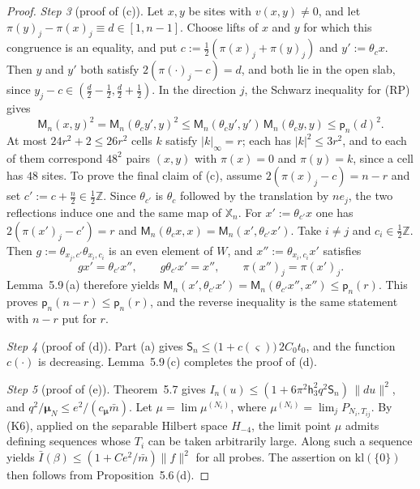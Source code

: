 \documentclass[11pt]{amsart}
\theoremstyle{definition}
\begin{document}
\begin{proof}
\emph{Step 3} (proof of (c)).
Let $x,y$ be sites with $v(x,y)\ne0$, and let $\pi(y)_j-\pi(x)_j\equiv d\in[1,n-1]$.
Choose lifts of $x$ and $y$ for which this congruence is an equality, and put $c:=\frac12(\pi(x)_j+\pi(y)_j)$ and $y':=\theta_cx$.
Then $y$ and $y'$ both satisfy $2(\pi(\cdot)_j-c)=d$, and both lie in the open slab, since $y_j-c\in(\frac d2-\frac12,\frac d2+\frac12)$.
In the direction $j$, the Schwarz inequality for (RP) gives
\begin{equation*}
\mathsf M_n(x,y)^2=\mathsf M_n(\theta_cy',y)^2\le\mathsf M_n(\theta_cy',y')\,\mathsf M_n(\theta_cy,y)\le\mathsf p_n(d)^2.
\end{equation*}
At most $24r^2+2\le26r^2$ cells $k$ satisfy $|k|_\infty=r$; each has $|k|^2\le3r^2$, and to each of them correspond $48^2$ pairs $(x,y)$ with $\pi(x)=0$ and $\pi(y)=k$, since a cell has $48$ sites.
To prove the final claim of (c), assume $2(\pi(x)_j-c)=n-r$ and set $c':=c+\frac n2\in\frac12\mathbb Z$.
Since $\theta_{c'}$ is $\theta_c$ followed by the translation by $ne_j$, the two reflections induce one and the same map of $\mathbb X_n$.
For $x':=\theta_{c'}x$ one has $2(\pi(x')_j-c')=r$ and $\mathsf M_n(\theta_cx,x)=\mathsf M_n(x',\theta_{c'}x')$.
Take $i\ne j$ and $c_i\in\frac12\mathbb Z$.
Then $g:=\theta_{x_j,c'}\theta_{x_i,c_i}$ is an even element of $W$, and $x'':=\theta_{x_i,c_i}x'$ satisfies
\begin{equation*}
gx'=\theta_{c'}x'',\qquad g\theta_{c'}x'=x'',\qquad\pi(x'')_j=\pi(x')_j.
\end{equation*}
Lemma~5.9\,(a) therefore yields $\mathsf M_n(x',\allowbreak \theta_{c'}x')=\allowbreak \mathsf M_n(\theta_{c'}x'',\allowbreak x'')\le\mathsf p_n(r)$.
This proves $\mathsf p_n(n-r)\le\mathsf p_n(r)$, and the reverse inequality is the same statement with $n-r$ put for $r$.

\emph{Step 4} (proof of (d)).
Part (a) gives $\mathsf S_n\le\bigl(1+c(\varsigma)\bigr)\,2C_0t_0$, and the function $c(\cdot)$ is decreasing.
Lemma~5.9\,(c) completes the proof of (d).

\emph{Step 5} (proof of (e)).
Theorem~5.7 gives $I_n(u)\le(1+6\pi^2\mathsf h_3^2q^2\mathsf S_n)\,\|du\|^2$, and $q^2/\boldsymbol\mu_N\le e^2/(c_{\boldsymbol\mu}\bar m)$.
Let $\mu=\lim\mu^{(N_i)}$, where $\mu^{(N_i)}=\lim_jP_{N_i,T_{ij}}$.
By (K6), applied on the separable Hilbert space $H_{-4}$, the limit point $\mu$ admits defining sequences whose $T_i$ can be taken arbitrarily large.
Along such a sequence \cite[Proposition~47.1\,(b1), (b5)]{QEDIII} yields $\bar I(\beta)\le(1+Ce^2/\bar m)\|f\|^2$ for all probes.
The assertion on $\mathrm{kl}(\{0\})$ then follows from Proposition~5.6\,(d).
\end{proof}
\end{document}
